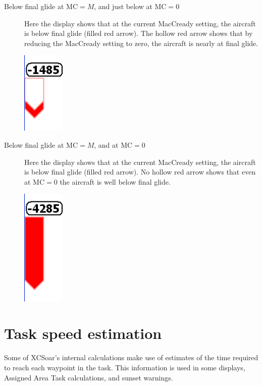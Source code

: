 \documentclass[a4paper,12pt]{refrep}
\begin{document}
\begin{description}
\item[Below final glide at MC$=M$, and just below at MC$=0$]
  Here the display shows that at the current MacCready setting, the aircraft
  is below final glide (filled red arrow).  The hollow red arrow
  shows that by reducing the MacCready setting to zero, the aircraft is
  nearly at final glide.
\begin{center}
\includegraphics[angle=0,width=2cm,keepaspectratio='true']{figures/fig-finalglide-littlebelow.png}
\end{center}

\item[Below final glide at MC$=M$, and at MC$=0$]
  Here the display shows that at the current MacCready setting, the aircraft
  is below final glide (filled red arrow).  No hollow red arrow
  shows that even at MC$=0$ the aircraft is well below final glide.
\begin{center}
\includegraphics[angle=0,width=2cm,keepaspectratio='true']{figures/fig-finalglide-allbelow.png}
\end{center}

\end{description}

\section{Task speed estimation}\label{sec:task-speed-estim}

Some of XCSoar's internal calculations make use of estimates of the
time required to reach each waypoint in the task.  This information is
used in some {\InfoBox} displays, Assigned Area Task calculations, and
sunset warnings.
\end{document}
